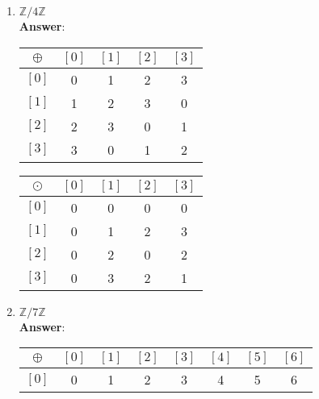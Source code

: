 \documentclass{article}
\begin{document}
\begin{enumerate}
            \begin{enumerate}
                  \item $\mathbb{Z}/4\mathbb{Z}$\\
                        \textbf{Answer}:
                        \begin{center}
                              \begin{tabular}{c|c c c c}
                                    $\oplus$ & $[0]$ & $[1]$ & $[2]$ & $[3]$ \\
                                    \hline
                                    $[0]$    & 0     & 1     & 2     & 3     \\
                                    $[1]$    & 1     & 2     & 3     & 0     \\
                                    $[2]$    & 2     & 3     & 0     & 1     \\
                                    $[3]$    & 3     & 0     & 1     & 2
                              \end{tabular}
                              \begin{tabular}{c|c c c c}
                                    $\odot$ & $[0]$ & $[1]$ & $[2]$ & $[3]$ \\
                                    \hline
                                    $[0]$   & 0     & 0     & 0     & 0     \\
                                    $[1]$   & 0     & 1     & 2     & 3     \\
                                    $[2]$   & 0     & 2     & 0     & 2     \\
                                    $[3]$   & 0     & 3     & 2     & 1
                              \end{tabular}
                        \end{center}
                  \item $\mathbb{Z}/7\mathbb{Z}$\\
                        \textbf{Answer}:
                        \begin{center}
                              \begin{tabular}{c|c c c c c c c}
                                    $\oplus$ & $[0]$ & $[1]$ & $[2]$ & $[3]$ & $[4]$ & $[5]$ & $[6]$ \\
                                    \hline
                                    $[0]$    & 0     & 1     & 2     & 3     & 4     & 5     & 6     \\

\end{tabular}
\end{center}
\end{enumerate}
\end{enumerate}
\end{document}
